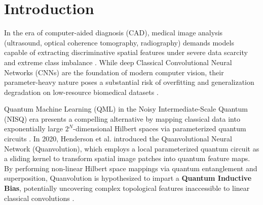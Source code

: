 \documentclass[runningheads]{llncs}
\begin{document}
\begin{abstract}
This work offers an honest, reproducible, and evidence-based benchmark, clarifying realistic boundaries for quantum-classical hybrid architectures in computer-aided medical diagnosis.

\end{abstract}

\section{Introduction}
In the era of computer-aided diagnosis (CAD), medical image analysis (ultrasound, optical coherence tomography, radiography) demands models capable of extracting discriminative spatial features under severe data scarcity and extreme class imbalance \cite{litjens2017survey,yang2023medmnist,esteva2019guide}. While deep Classical Convolutional Neural Networks (CNNs) are the foundation of modern computer vision, their parameter-heavy nature poses a substantial risk of overfitting and generalization degradation on low-resource biomedical datasets \cite{shorten2019survey}.

Quantum Machine Learning (QML) in the Noisy Intermediate-Scale Quantum (NISQ) era presents a compelling alternative by mapping classical data into exponentially large $2^N$-dimensional Hilbert spaces via parameterized quantum circuits \cite{biamonte2017quantum,cerezo2021variational}. In 2020, Henderson et al. \cite{henderson2020quanvolutional} introduced the Quanvolutional Neural Network (Quanvolution), which employs a local parameterized quantum circuit as a sliding kernel to transform spatial image patches into quantum feature maps. By performing non-linear Hilbert space mappings via quantum entanglement and superposition, Quanvolution is hypothesized to impart a \textbf{Quantum Inductive Bias}, potentially uncovering complex topological features inaccessible to linear classical convolutions \cite{huang2021power,vu2024exploring}.
\end{document}
